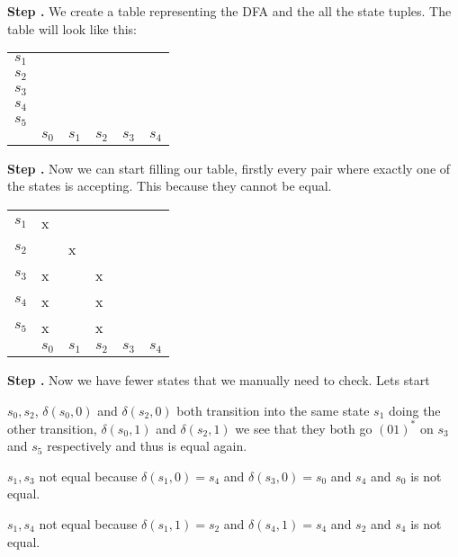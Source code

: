 \documentclass{article}
\newcounter{step}
\newcommand\Step{%
  \stepcounter{step}%
  \textbf{Step \thestep. }%
}
\begin{document}
\Step We create a table representing the DFA and the all the state tuples. The table will look like this:

\begin{center}
\begin{tabular}{l*{5}{|m{.2cm}}|}
	$s_1$&\\
	$s_2$&&\\
	$s_3$&&&\\
	$s_4$&&&&\\
	$s_5$&&&&&\\
 &
 &
 &
 &
 &
 \\
\end{tabular}
\end{center}
\newpage
\Step Now we can start filling our table, firstly every pair where exactly one of the states is 
accepting. This because they cannot be equal.

\begin{center}
\begin{tabular}{l*{5}{|m{.2cm}}|}
	$s_1$&x\\
	$s_2$&&x\\
	$s_3$&x&&x\\
	$s_4$&x&&x&\\
	$s_5$&x&&x&&\\
 &
 &
 &
 &
 &
 \\
\end{tabular}
\end{center}

\Step Now we have fewer states that we manually need to check. Lets start

$s_0,s_2$, $\delta (s_0, 0)$ and $\delta (s_2,0)$ both transition into the same state $s_1$
doing the other transition, $\delta (s_0,1)$ and $\delta (s_2,1)$ we see that they both go $(01)^*$
on $s_3$ and $s_5$ respectively and thus is equal again.

$s_1,s_3$ not equal because $\delta (s_1,0) = s_4$ and $\delta (s_3,0) = s_0$ and $s_4$ and $s_0$ is not
equal.

$s_1,s_4$ not equal because $\delta (s_1,1) = s_2$ and $\delta (s_4,1) = s_4$ and $s_2$ and $s_4$ is not
equal.
\end{document}
